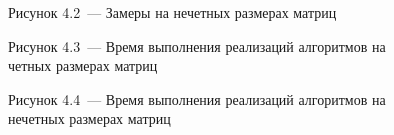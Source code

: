 \documentclass[12pt, a4paper]{report}
\begin{document}
\begin{figure}[H]
	\caption*{Рисунок 4.2~--- Замеры на нечетных размерах матриц}
\end{figure}

\begin{figure}[H]
	\caption*{Рисунок 4.3~--- Время выполнения реализаций алгоритмов на четных размерах матриц}
\end{figure}

\begin{figure}[H]
	\caption*{Рисунок 4.4~--- Время выполнения реализаций алгоритмов на нечетных размерах матриц}
\end{figure}
\end{document}
